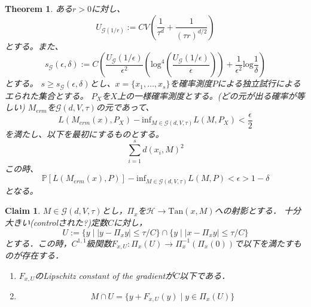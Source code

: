\documentclass{ujarticle}
\newtheorem{thm}{Theorem}[section]
\newtheorem{clm}{Claim}
\newcommand{\gdvt}{\mathcal{G}(d,V,\tau)}
\begin{document}
\begin{thm}
 ある$r > 0$に対し、
 \begin{equation*}
  U_{\mathcal{G}(1/r)}:=CV( \frac{ 1 }{ \tau^d } + \frac{ 1 }{ (\tau r)^{d/2} } )
 \end{equation*}
 とする。また、
 \begin{equation*}
  s_{\mathcal{G}}(\epsilon,\delta):=C(\frac{ U_{\mathcal{G}}(1/\epsilon) }{ \epsilon^2 }(\mathrm{log}^4
  (\frac{U_{\mathcal{G}}(1/\epsilon)}{\epsilon})) + \frac{ 1 }{ \epsilon^2 }\mathrm{log}\frac{ 1 }{ \delta }  )
 \end{equation*}
とする。
$s \ge s_{\mathcal{G}}(\epsilon,\delta)$とし、$x=\{ x_1,\dots,x_s\}$を確率測度$P$による独立試行によるエられた集合とする。
$P_X$を$X$上の一様確率測度とする。(どの元が出る確率が等しい)
$M_{erm}$を$\mathcal{G}(d,V,\tau)$の元であって、
\begin{equation*}
 L(M_{erm}(x),P_X) - \mathrm{inf}_{M \in \mathcal{G}(d,V,\tau)} L(M,P_X) < \frac{ \epsilon }{ 2 }
\end{equation*}
を満たし、以下を最初にするものとする。
\begin{equation*}
 \sum_{i=1}^sd(x_i,M)^2
\end{equation*}
この時、
\begin{equation*}
 \mathbb{P}[L(M_{erm}(x),P)] - \mathrm{inf}_{M \in \mathcal{G}(d,V,\tau)} L(M,P) < \epsilon > 1- \delta
\end{equation*}
となる。
\end{thm}

\begin{clm}
  $M \in \gdvt$とし，$\Pi_x$を$\mathcal{H} \to \mathrm{Tan}(x,M)$への射影とする．
  十分大きい(controlされた?)定数$C$に対し，
  \begin{equation*}
   U:= \{ y \mid |y - \Pi_xy| \le \tau/C \} \cap \{ y \mid |x - \Pi_x y| \le \tau/C \}
  \end{equation*}
  とする．この時，$C^{1,1}$級関数$F_{x,U}:\Pi_x(U) \to \Pi_x^{-1}(\Pi_x(0))$で以下を満たすものが存在する．
  \begin{enumerate}
    \item $F_{x,U}$のLipschitz constant of the gradientが$C$以下である．
    \item \begin{equation*}
    M \cap U = \{ y + F_{x,U}(y) \mid y \in \Pi_x(U) \}
    \end{equation*}
  \end{enumerate}
\end{clm}
\end{document}
